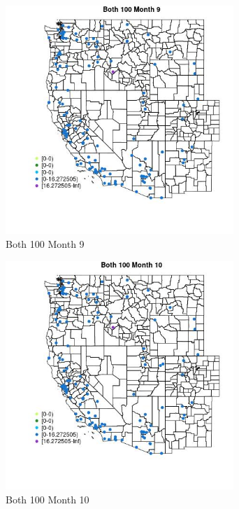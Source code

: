 \begin{figure} 
\centering  
\includegraphics[width=0.77\textwidth]{Code_Outputs/Report_ML_input_PM25_Step4_part_e_de_duplicated_aves_MapObsMo9Both_100.jpg} 
\caption{\label{fig:Report_ML_input_PM25_Step4_part_e_de_duplicated_avesMapObsMo9Both_100}Both 100 Month 9} 
\end{figure} 
 

\begin{figure} 
\centering  
\includegraphics[width=0.77\textwidth]{Code_Outputs/Report_ML_input_PM25_Step4_part_e_de_duplicated_aves_MapObsMo10Both_100.jpg} 
\caption{\label{fig:Report_ML_input_PM25_Step4_part_e_de_duplicated_avesMapObsMo10Both_100}Both 100 Month 10} 
\end{figure} 
 

